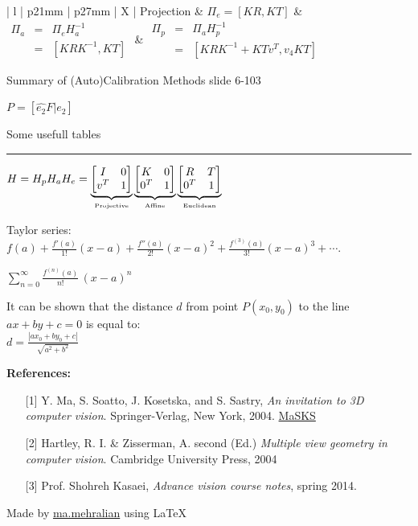 \documentclass{../cheat}
\begin{document}
\begin{tables}
\begin{multicols}{2}
\begin{tabularx}{\columnwidth}{| l | p{21mm} | p{27mm}	 | X |}
		Projection & $\Pi_{e}=[KR,KT]$ 
		&  $\begin{array}{lcl}
			\Pi_{a} &=& \Pi_{e}H_a^{-1}\\
			&=&[KRK^{-1},KT]
			\end{array} $
		 & $\begin{array}{lcl}
		 	\Pi_{p} &=& \Pi_{a}H_p^{-1}\\
		 	&=&[KRK^{-1}+KTv^T,v_4 KT]
		 	\end{array} $ \\ \hline	
	\end{tabularx}
	Summary of (Auto)Calibration Methods slide 6-103
	
	$P=[\widehat{e_2}F|e_2]$
\end{multicols}
\caption{Some usefull tables}
\end{tables}


\begin{multicols}{3}
\vspace{5mm}
\rule{0.3\linewidth}{0.25pt}
\scriptsize

	$H = H_p  H_a  H_e =
	\underbrace{\begin{bmatrix} I & 0 \\ v^T &  1\end{bmatrix}}_{ \textrm{\tiny Projective}}
	\underbrace{\begin{bmatrix} K & 0 \\ 0^T &  1	\end{bmatrix}}_{\textrm{\tiny Affine}}
	\underbrace{\begin{bmatrix}	R & T \\ 0^T &  1 \end{bmatrix}}_{\textrm{\tiny Euclidean}}$


	Taylor series:\\	
	$f(a)+\frac {f'(a)}{1!} (x-a)+ \frac{f''(a)}{2!} (x-a)^2+\frac{f^{(3)}(a)}{3!}(x-a)^3+ \cdots. $
	
	$ \sum_{n=0} ^ {\infty} \frac {f^{(n)}(a)}{n!} \, (x-a)^{n}$
	
	It can be shown that the distance $d$ from point $P(x_0, y_0)$ to the line $ax + by + c = 0$ is equal to:\\	
	$d = \frac{|ax_0 + by_0 + c|}{\sqrt{a^2 + b^2}}$


\textbf{References:}
\begin{itemize}[leftmargin=2em]
	\item [{[1]}]  Y. Ma, S. Soatto, J. Kosetska, and S. Sastry, \textit{An invitation to 3D computer vision}. Springer-Verlag, New York, 2004. \href{http://vision.ucla.edu/MASKS/}{\url{MaSKS}}
	\item [{[2]}] Hartley, R. I. \& Zisserman, A. second (Ed.) \textit{Multiple view geometry in computer vision}. Cambridge University Press, 2004
	\item [{[3]}] Prof. Shohreh Kasaei, \textit{Advance vision course notes}, spring 2014.
\end{itemize}
Made by \href{http://webpages.iust.ac.ir/mehralian/}{ma.mehralian} using \LaTeX
\end{multicols}
\end{document}
